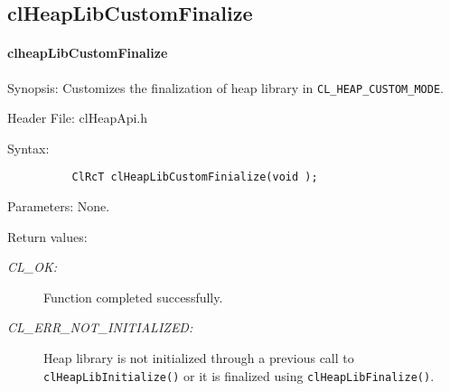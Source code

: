 \begin{flushleft}
\subsection{clHeapLibCustomFinalize}
\hypertarget{pageheap131}{}\paragraph{cl\-heap\-Lib\-Custom\-Finalize}\label{pageheap131}
\begin{Desc}
\item[Synopsis:]Customizes the finalization of heap library in {\tt{CL\_\-HEAP\_\-CUSTOM\_\-MODE}}. \end{Desc}
\begin{Desc}
\item[Header File:]clHeapApi.h\end{Desc}
\begin{Desc}
\item[Syntax:]

\footnotesize
\begin{verbatim}          ClRcT clHeapLibCustomFinialize(void );

\end{verbatim}
\normalsize
\end{Desc}
\begin{Desc}
\item[Parameters:] None.
\end{Desc}
\begin{Desc}
\item[Return values:]
\begin{description}
\item[{\em CL\_\-OK:}] Function completed successfully.
\item[{\em CL\_\-ERR\_\-NOT\_\-INITIALIZED:}] Heap library is not initialized through a previous call to {\tt{clHeapLibInitialize()}} or it is  
finalized using {\tt{clHeapLibFinalize()}}.
\end{description}


\end{Desc}
\end{flushleft}
